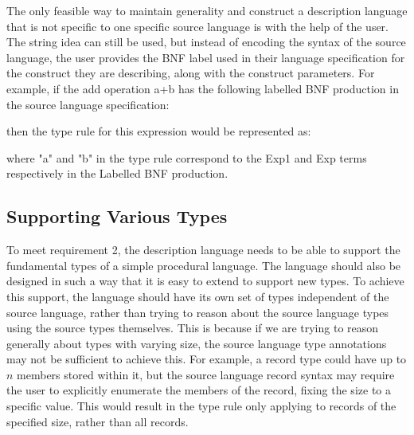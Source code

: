 \documentclass{UoYCSproject}
\begin{document}
The only feasible way to maintain generality and construct a description
language that is not specific to one specific source language is with the
help of the user. The string idea can still be used, but instead of encoding 
the syntax of the source language, the user provides the BNF label used in their
language specification for the construct they are describing, along with the
construct parameters. For example, if the add operation {\ttfamily a+b} has
the following labelled BNF production in the source language specification:

then the type rule for this expression would be represented as:

where {\ttfamily "a"} and {\ttfamily "b"} in the type rule correspond to the 
{\ttfamily Exp1} and {\ttfamily Exp} terms respectively in the Labelled BNF 
production.

\subsection{Supporting Various Types}
To meet requirement 2, the description language needs to be able to support the
fundamental types of a simple procedural language. The language should also be
designed in such a way that it is easy to extend to support new types. To achieve
this support, the language should have its own set of types independent of the
source language, rather than trying to reason about the source language types
using the source types themselves. This is because if we are trying to reason generally
about types with varying size, the source language type annotations may not
be sufficient to achieve this. For example, a record type could have up to $n$
members stored within it, but the source language record syntax may require the
user to explicitly enumerate the members of the record, fixing the size to a 
specific value. This would result in the type rule only applying to records of
the specified size, rather than all records.
\end{document}
